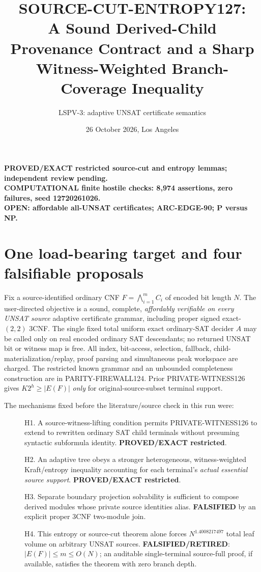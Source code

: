 \documentclass[11pt]{article}
\title{SOURCE-CUT-ENTROPY127:\\
A Sound Derived-Child Provenance Contract and a Sharp Witness-Weighted Branch-Coverage Inequality}
\author{LSPV-3: adaptive UNSAT certificate semantics}
\date{26 October 2026, Los Angeles}
\begin{document}
\maketitle
\begin{center}
\textbf{PROVED/EXACT restricted source-cut and entropy lemmas; independent review pending.}\\
\textbf{COMPUTATIONAL finite hostile checks: 8,974 assertions, zero failures, seed 12720261026.}\\
\textbf{OPEN: affordable all-UNSAT certificates; ARC-EDGE-90; P versus NP.}
\end{center}

\section{One load-bearing target and four falsifiable proposals}
Fix a source-identified ordinary CNF $F=\bigwedge_{i=1}^m C_i$ of
encoded bit length $N$. The user-directed objective is a sound,
complete, \emph{affordably verifiable on every UNSAT source}
adaptive certificate grammar, including proper signed exact-$(2,2)$
3CNF. The single fixed total uniform exact ordinary-SAT decider $A$
may be called only on real encoded ordinary SAT descendants; no
returned UNSAT bit or witness map is free. All index, bit-access,
selection, fallback, child-materialization/replay, proof parsing and
simultaneous peak workspace are charged. The restricted known grammar
and an unbounded completeness construction are in PARITY-FIREWALL124.
Prior PRIVATE-WITNESS126 gives $K2^h\ge |E(F)|$ \emph{only} for
original-source-subset terminal support.

The mechanisms fixed before the literature/source check in this run were:
\begin{description}
\item[] H1. A source-witness-lifting condition permits PRIVATE-WITNESS126
to extend to rewritten ordinary SAT child terminals without presuming
syntactic subformula identity. \textbf{PROVED/EXACT restricted}.
\item[] H2. An adaptive tree obeys a stronger heterogeneous,
witness-weighted Kraft/entropy inequality accounting for each
terminal's \emph{actual essential source support}. \textbf{PROVED/EXACT restricted}.
\item[] H3. Separate boundary projection solvability is sufficient to
compose derived modules whose private source identities alias.
\textbf{FALSIFIED} by an explicit proper 3CNF two-module join.
\item[] H4. This entropy or source-cut theorem alone forces
$N^{1.4008217497}$ total leaf volume on arbitrary UNSAT sources.
\textbf{FALSIFIED/RETIRED}: $|E(F)|\le m\le O(N)$;
an auditable single-terminal source-full proof, if available,
satisfies the theorem with zero branch depth.
\end{description}
\end{document}
